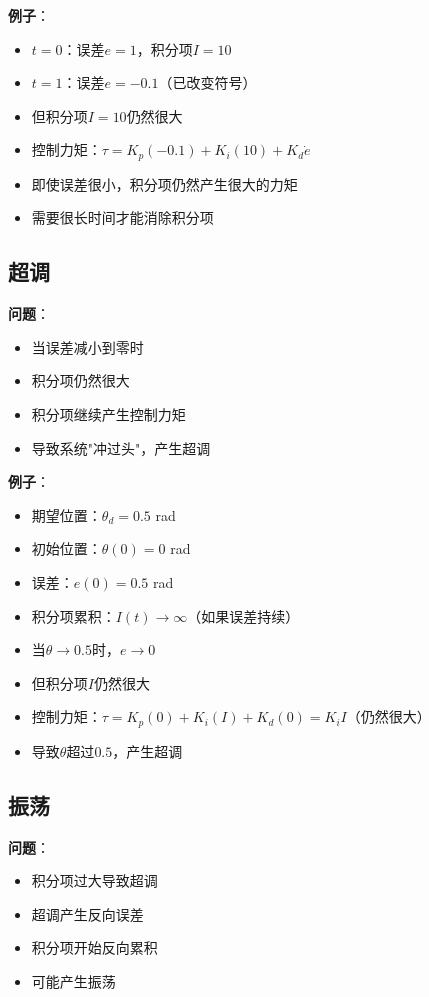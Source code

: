 \documentclass[12pt,a4paper]{article}
\begin{document}
\textbf{例子}：
\begin{itemize}
\item $t = 0$：误差$e = 1$，积分项$I = 10$
\item $t = 1$：误差$e = -0.1$（已改变符号）
\item 但积分项$I = 10$仍然很大
\item 控制力矩：$\tau = K_p(-0.1) + K_i(10) + K_d \dot{e}$
\item 即使误差很小，积分项仍然产生很大的力矩
\item 需要很长时间才能消除积分项
\end{itemize}

\subsection{超调}

\textbf{问题}：
\begin{itemize}
\item 当误差减小到零时
\item 积分项仍然很大
\item 积分项继续产生控制力矩
\item 导致系统"冲过头"，产生超调
\end{itemize}

\textbf{例子}：
\begin{itemize}
\item 期望位置：$\theta_d = 0.5$ rad
\item 初始位置：$\theta(0) = 0$ rad
\item 误差：$e(0) = 0.5$ rad
\item 积分项累积：$I(t) \to \infty$（如果误差持续）
\item 当$\theta \to 0.5$时，$e \to 0$
\item 但积分项$I$仍然很大
\item 控制力矩：$\tau = K_p(0) + K_i(I) + K_d(0) = K_i I$（仍然很大）
\item 导致$\theta$超过$0.5$，产生超调
\end{itemize}

\subsection{振荡}

\textbf{问题}：
\begin{itemize}
\item 积分项过大导致超调
\item 超调产生反向误差
\item 积分项开始反向累积
\item 可能产生振荡
\end{itemize}
\end{document}
